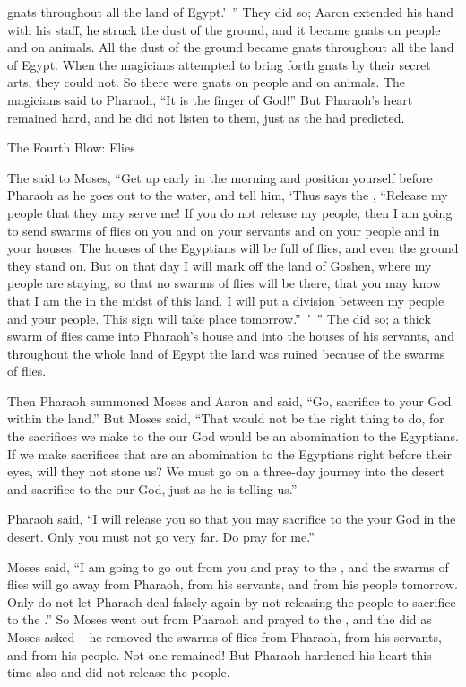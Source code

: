 {gnats
throughout all
the land
of Egypt.’ ”
They did
so;
Aaron
extended
his hand
with his staff,
he struck
the
dust
of the ground,
and it became
gnats
on people
and on animals.
All
the dust
of the ground
became
gnats
throughout all
the land
of Egypt.
When
the magicians
attempted
to bring forth
gnats
by their secret arts, they could
not.
So there
were gnats
on people
and on animals.
The magicians
said
to
Pharaoh,
“It is
the finger
of God!” But Pharaoh’s
heart
remained hard, and he did not
listen
to
them, just
as the
{}
had predicted.
\par }{\SH The Fourth Blow: Flies
\par }{\PP {}The
{}
said
to
Moses,
“Get up early
in the morning
and position
yourself before
Pharaoh
as he goes
out
to the water,
and tell
him,
‘Thus
says
the {}, “Release
my people
that they may serve me!
If
you do not
release
my people,
then I am going
to send
swarms of flies
on
you and on
your servants
and on
your people
and in your houses.
The
houses
of the Egyptians
will be full
of flies,
and even
the ground
they
stand on.
But on that day
I will mark
off the
land
of Goshen,
where
my people
are staying,
so that no swarms of flies
will be
there,
that you may
know
that
I am
the {}
in the midst
of this land.
I will put
a division
between
my people
and your people.
This
sign
will take place tomorrow.” ’ ”
The
{}
did
so;
a thick swarm of flies
came
into Pharaoh’s
house
and into the houses
of his servants,
and throughout the whole
land
of Egypt
the land
was ruined
because of the swarms of flies.
\par }{\PP {}Then Pharaoh
summoned
Moses
and Aaron
and said,
“Go,
sacrifice
to your God
within the land.”
But Moses
said,
“That would not
be the right
thing to do,
for
the sacrifices
we make to the
{}
our God
would be an abomination
to the Egyptians.
If
we make sacrifices
that are an abomination
to the Egyptians
right before their eyes,
will they not
stone us?
We must go
on a three-day
journey
into the desert
and sacrifice
to the
{}
our God,
just
as he is telling
us.”
\par }{\PP {}Pharaoh
said,
“I
will release
you so that you may sacrifice
to the
{}
your God
in the desert.
Only
you must
not
go
very far.
Do pray
for me.”
\par }{\PP {}Moses
said,
“I
am
going to go out
from you
and pray
to
the {}, and the swarms
of flies
will go away from
Pharaoh,
from his servants,
and from his people
tomorrow.
Only
do not
let Pharaoh
deal falsely
again
by not
releasing
the
people
to sacrifice
to the
{}.”
So Moses
went out
from Pharaoh
and prayed
to
the {},
and the
{}
did
as
Moses asked – he removed the swarms of flies from Pharaoh, from his servants, and from his people. Not one remained!
But
Pharaoh
hardened
his heart
this
time
also
and did not
release
the people.

}
